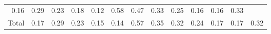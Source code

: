 \begin{table}[!h]
\begin{tabular}{lllllllllllll}
  \multicolumn{1}{|r}{0.16} &
  \multicolumn{1}{r}{0.29} &
  \multicolumn{1}{r}{0.23} &
  \multicolumn{1}{r}{0.18} &
  \multicolumn{1}{r}{0.12} &
  \multicolumn{1}{r}{0.58} &
  \multicolumn{1}{r}{0.47} &
  \multicolumn{1}{r}{0.33} &
  \multicolumn{1}{r}{0.25} &
  \multicolumn{1}{r}{0.16} &
  \multicolumn{1}{r}{0.16} &
  \multicolumn{1}{r}{0.33} \\
\multicolumn{1}{l}{\hspace{1em}Total} &
  \multicolumn{1}{|r}{0.17} &
  \multicolumn{1}{r}{0.29} &
  \multicolumn{1}{r}{0.23} &
  \multicolumn{1}{r}{0.15} &
  \multicolumn{1}{r}{0.14} &
  \multicolumn{1}{r}{0.57} &
  \multicolumn{1}{r}{0.35} &
  \multicolumn{1}{r}{0.32} &
  \multicolumn{1}{r}{0.24} &
  \multicolumn{1}{r}{0.17} &
  \multicolumn{1}{r}{0.17} &
  \multicolumn{1}{r}{0.32} \\
\cline{1-13}
\end{tabular}
\end{table}

